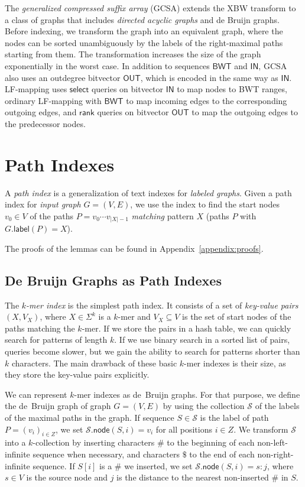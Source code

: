 \documentclass[twoside,leqno,twocolumn]{article}
\newcommand{\abs}[1]{\ensuremath{\lvert #1 \rvert}}
\newcommand{\rank}{\ensuremath{\mathsf{rank}}}
\newcommand{\select}{\ensuremath{\mathsf{select}}}
\newcommand{\glabel}{\ensuremath{\mathsf{label}}}
\newcommand{\gnode}{\ensuremath{\mathsf{node}}}
\newcommand{\kmer}[1]{$#1$\nobreakdash-mer}
\newcommand{\kcollection}[1]{$#1$\nobreakdash-collection}
\newcommand{\LFmapping}{LF\nobreakdash-mapping}
\newcommand{\BWT}{\ensuremath{\mathsf{BWT}}}
\newcommand{\bvIN}{\ensuremath{\mathsf{IN}}}
\newcommand{\bvOUT}{\ensuremath{\mathsf{OUT}}}
\begin{document}
The \emph{generalized compressed suffix array} (GCSA) \cite{Siren2014} extends the XBW transform to a class of graphs that includes \emph{directed acyclic graphs} and de Bruijn graphs. Before indexing, we transform the graph into an equivalent graph, where the nodes can be sorted unambiguously by the labels of the right-maximal paths starting from them. The transformation increases the size of the graph exponentially in the worst case. In addition to sequences $\BWT$ and $\bvIN$, GCSA also uses an outdegree bitvector $\bvOUT$, which is encoded in the same way as $\bvIN$. \LFmapping{} uses $\select$ queries on bitvector $\bvIN$ to map nodes to BWT ranges, ordinary \LFmapping{} with $\BWT$ to map incoming edges to the corresponding outgoing edges, and $\rank$ queries on bitvector $\bvOUT$ to map the outgoing edges to the predecessor nodes.


\section{Path Indexes}\label{sect:path-indexes}

A \emph{path index} is a generalization of text indexes for \emph{labeled graphs}. Given a path index for \emph{input graph} $G = (V, E)$, we use the index to find the start nodes $v_{0} \in V$ of the paths $P = v_{0} \dotsm v_{\abs{X}-1}$ \emph{matching} pattern $X$ (paths $P$ with $G.\glabel(P) = X$).

The proofs of the lemmas can be found in Appendix~\ref{appendix:proofs}.

\subsection{De Bruijn Graphs as Path Indexes}

The \emph{\kmer{k} index} is the simplest path index. It consists of a set of \emph{key-value pairs} $(X, V_{X})$, where $X \in \Sigma^{k}$ is a \kmer{k} and $V_{X} \subseteq V$ is the set of start nodes of the paths matching the \kmer{k}. If we store the pairs in a hash table, we can quickly search for patterns of length $k$. If we use binary search in a sorted list of pairs, queries become slower, but we gain the ability to search for patterns shorter than $k$ characters. The main drawback of these basic \kmer{k} indexes is their size, as they store the key-value pairs explicitly.

We can represent \kmer{k} indexes as de~Bruijn graphs. For that purpose, we define the de~Bruijn graph of graph $G = (V, E)$ by using the collection $\mathcal{S}$ of the labels of the maximal paths in the graph. If sequence $S \in \mathcal{S}$ is the label of path $P = (v_{i})_{i \in Z}$, we set $\mathcal{S}.\gnode(S, i) = v_{i}$ for all positions $i \in Z$. We transform $\mathcal{S}$ into a \kcollection{k} by inserting characters $\#$ to the beginning of each non-left-infinite sequence when necessary, and characters $\$$ to the end of each non-right-infinite sequence. If $S[i]$ is a $\#$ we inserted, we set $\mathcal{S}.\gnode(S, i) = s:j$, where $s \in V$ is the source node and $j$ is the distance to the nearest non-inserted $\#$ in $S$.
\end{document}

